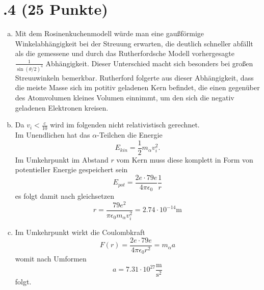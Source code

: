 \section*{\nr.4 \titfour (25 Punkte)}
\begin{enumerate}[(a)]
\item Mit dem Rosinenkuchenmodell würde man eine gaußförmige Winkelabhängigkeit bei der Streuung erwarten, die deutlich schneller abfällt als die gemessene und durch das Rutherfordsche Modell vorhergesagte $\frac{1}{\sin(\theta/2)^4}$ Abhängigkeit. Dieser Unterschied macht sich besonders bei großen Streuuwinkeln bemerkbar. Rutherford folgerte aus dieser Abhängigkeit, dass die meiste Masse sich im potitiv geladenen Kern befindet, die einen gegenüber des Atomvolumen kleines Volumen einnimmt, um den sich die negativ geladenen Elektronen kreisen.
\item Da $v_i<\frac{c}{10}$ wird im folgenden nicht relativistisch gerechnet.\\
Im Unendlichen hat das $\alpha$-Teilchen die Energie
\begin{equation}
  E_{kin}=\frac{1}{2}m_{\alpha}v_i^2.
\end{equation}
Im Umkehrpunkt im Abstand $r$ vom Kern muss diese komplett in Form von potentieller Energie gespeichert sein
\begin{equation}
  E_{pot}=\frac{2e\cdot79e}{4\pi\epsilon_0}\frac{1}{r}
\end{equation}
es folgt damit nach gleichsetzen
\begin{equation}
  r=\frac{79e^2}{\pi\epsilon_0m_{\alpha}v_i^2}=2.74\cdot 10^{-14}\mathrm{m}
\end{equation}
\item Im Umkehrpunkt wirkt die Coulombkraft
\begin{equation}
  F(r)=\frac{2e\cdot 79e}{4\pi\epsilon_0 r^2}=m_{\alpha}a
\end{equation}
womit nach Umformen
\begin{equation}
  a=7.31\cdot10^{27}\frac{\mathrm{m}}{\mathrm{s}^2}
\end{equation}
folgt.
\end{enumerate}